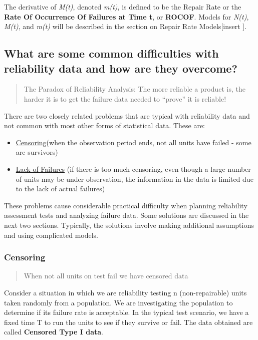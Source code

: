 \documentclass[]{book}
\providecommand{\tightlist}{%
  \setlength{\itemsep}{0pt}\setlength{\parskip}{0pt}}
\theoremstyle{definition}
\theoremstyle{definition}
\theoremstyle{definition}
\theoremstyle{remark}
\begin{document}
The derivative of \emph{M(t)}, denoted \emph{m(t)}, is defined to be the
Repair Rate or the \textbf{Rate Of Occurrence Of Failures at Time t}, or
\textbf{ROCOF}. Models for \emph{N(t)}, \emph{M(t)}, and \emph{m(t)}
will be described in the section on Repair Rate Models{[}insert {]}.

\subsection{What are some common difficulties with reliability data and
how are they
overcome?}\label{what-are-some-common-difficulties-with-reliability-data-and-how-are-they-overcome}

\begin{quote}
The Paradox of Reliability Analysis: The more reliable a product is, the
harder it is to get the failure data needed to ``prove'' it is reliable!
\end{quote}

There are two closely related problems that are typical with reliability
data and not common with most other forms of statistical data. These
are:

\begin{itemize}
\tightlist
\item
  \href{insert}{Censoring}(when the observation period ends, not all
  units have failed - some are survivors)
\item
  \href{insert}{Lack of Failures} (if there is too much censoring, even
  though a large number of units may be under observation, the
  information in the data is limited due to the lack of actual failures)
\end{itemize}

These problems cause considerable practical difficulty when planning
reliability assessment tests and analyzing failure data. Some solutions
are discussed in the next two sections. Typically, the solutions involve
making additional assumptions and using complicated models.

\subsubsection{Censoring}\label{censoring}

\begin{quote}
When not all units on test fail we have censored data
\end{quote}

Consider a situation in which we are reliability testing n
(non-repairable) units taken randomly from a population. We are
investigating the population to determine if its failure rate is
acceptable. In the typical test scenario, we have a fixed time T to run
the units to see if they survive or fail. The data obtained are called
\textbf{Censored Type I data}.
\end{document}
